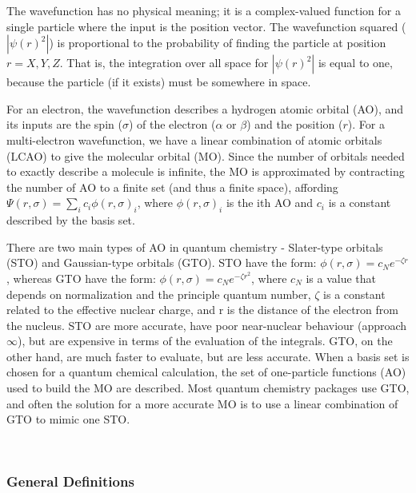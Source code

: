 \documentclass[12pt]{article}
\begin{document}
The wavefunction has no physical meaning; it is a complex-valued function for a 
single particle where the input is the position vector. The wavefunction 
squared ($|\psi(r)^2|$) is proportional to the probability of finding the 
particle at position $r = X,Y,Z$. That is, the integration over all space for 
$|\psi(r)^2|$ is equal to one, because the particle (if it exists) must be 
somewhere in space.

For an electron, the wavefunction describes a hydrogen atomic orbital (AO), and 
its inputs are the spin ($\sigma$) of the electron ($\alpha$ or $\beta$) and 
the position ($r$). For a multi-electron wavefunction, we have a linear 
combination of atomic orbitals (LCAO) to give the molecular orbital (MO). Since 
the number of orbitals needed to exactly describe a molecule is infinite, the 
MO is approximated by contracting the number of AO to a finite set (and thus a 
finite space), affording $\Psi(r, \sigma) = \sum\limits_{i}c_i 
\phi(r,\sigma)_i$, where $\phi(r,\sigma)_i$ is the ith AO and $c_i$ is a 
constant  
described by the basis set.

There are two main types of AO in quantum chemistry - Slater-type orbitals 
(STO) and Gaussian-type orbitals (GTO). STO have the form: $\phi(r,\sigma) = 
c_Ne^{-\zeta r}$, whereas GTO have the form: $\phi(r,\sigma) = c_Ne^{-\zeta 
r^2}$, 
where $c_N$ is a value that depends on normalization and 
the principle quantum 
number, $\zeta$ is a constant related to the effective nuclear charge, and r is 
the distance of the electron from the nucleus. STO are more accurate, have poor 
near-nuclear behaviour (approach $\infty$), but are expensive in terms of the 
evaluation of the integrals. GTO, on the other hand, are much faster to 
evaluate, but are less accurate. When a basis set is chosen for a quantum 
chemical calculation, the set of one-particle functions (AO) used to build the 
MO are described. Most quantum chemistry packages use GTO, and often the 
solution for a more accurate MO is to use a linear combination of GTO to mimic 
one STO.


~\newline

\subsubsection{General Definitions}\label{sec_gendef}
\end{document}
